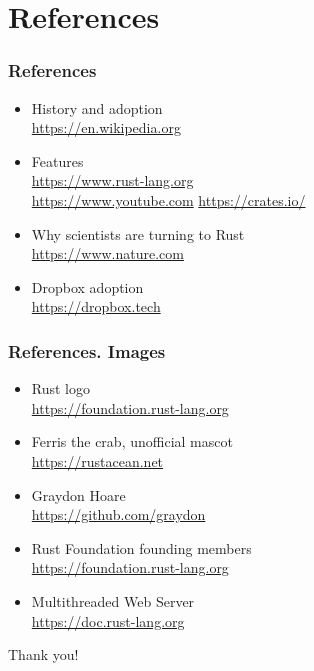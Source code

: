 \documentclass{beamer}
\begin{document}
\section{References}

\begin{frame}
\frametitle{References}
\begin{itemize}
\item History and adoption\\
\href{https://en.wikipedia.org/wiki/Rust_(programming_language)}{https://en.wikipedia.org}
\item Features\\
\href{https://www.rust-lang.org/}{https://www.rust-lang.org}\\
\href{https://www.youtube.com/watch?v=IDpe6k_IIfU}{https://www.youtube.com}
\href{https://crates.io/}{https://crates.io/}\\
\item Why scientists are turning to Rust\\
\href{https://www.nature.com/articles/d41586-020-03382-2}{https://www.nature.com}
\item Dropbox adoption\\
\href{https://dropbox.tech/infrastructure/rewriting-the-heart-of-our-sync-engine}{https://dropbox.tech}
\end{itemize}
\end{frame}

\begin{frame}
\frametitle{References. Images}
\begin{itemize}
\item Rust logo\\
\href{https://foundation.rust-lang.org/policies/logo-policy-and-media-guide/\#the-rust-trademarks}{https://foundation.rust-lang.org}
\item Ferris the crab, unofficial mascot\\
\href{https://rustacean.net}{https://rustacean.net}
\item Graydon Hoare\\
\href{https://github.com/graydon}{https://github.com/graydon}
\item Rust Foundation founding members\\
\href{https://foundation.rust-lang.org/members/}{https://foundation.rust-lang.org}
\item Multithreaded Web Server\\
\href{https://doc.rust-lang.org/stable/book/ch20-00-final-project-a-web-server.html}{https://doc.rust-lang.org}
\end{itemize}
\end{frame}

\begin{frame}
\Huge{\centerline{Thank you!}}
\end{frame}
\end{document}
